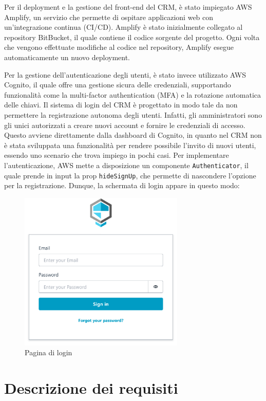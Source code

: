 \documentclass[target=bach,aauheader=,style=]{thud}
\begin{document}
\noindent Per il deployment e la gestione del front-end del CRM, è stato impiegato AWS Amplify, un servizio che permette di ospitare applicazioni web con un'integrazione continua (CI/CD). Amplify è stato inizialmente collegato al repository BitBucket, il quale contiene il codice sorgente del progetto. Ogni volta che vengono effettuate modifiche al codice nel repository, Amplify esegue automaticamente un nuovo deployment.

\noindent Per la gestione dell'autenticazione degli utenti, è stato invece utilizzato AWS Cognito, il quale offre una gestione sicura delle credenziali, supportando funzionalità come la multi-factor authentication (MFA) e la rotazione automatica delle chiavi. Il sistema di login del CRM è progettato in modo tale da non permettere la registrazione autonoma degli utenti. Infatti, gli amministratori sono gli unici autorizzati a creare nuovi account e fornire le credenziali di accesso. Questo avviene direttamente dalla dashboard di Cognito, in quanto nel CRM non è stata sviluppata una funzionalità per rendere possibile l'invito di nuovi utenti, essendo uno scenario che trova impiego in pochi casi. Per implementare l'autenticazione, AWS mette a disposizione un componente \texttt{Authenticator}, il quale prende in input la prop \texttt{hideSignUp}, che permette di nascondere l'opzione per la registrazione. Dunque, la schermata di login appare in questo modo:

\begin{figure}[H]
    \centering
    \includegraphics[width=0.7\textwidth]{img/login.pdf} 
    \caption{Pagina di login}
\end{figure}


\chapter{Descrizione dei requisiti}
\end{document}
